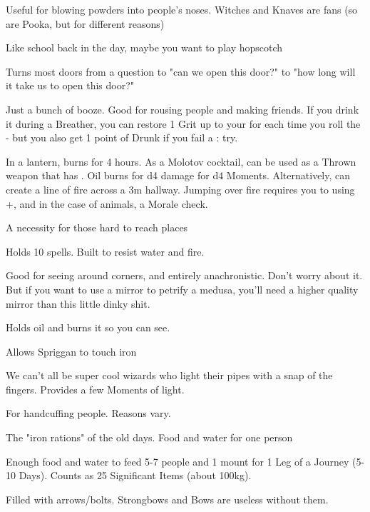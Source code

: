 {\begin{multicols}{2}
   Useful for blowing powders into people's noses.  Witches and Knaves are fans (so are Pooka, but for different reasons)
  
   Like school back in the day, maybe you want to play hopscotch
  
   Turns most doors from a question to "can we open this door?" to "how long will it take us to open this door?"
  
   Just a bunch of booze. Good for rousing people and making friends. If you drink it during a Breather, you can restore 1 Grit up to your \MAX for each time you roll the \UD - but you also get 1 point of Drunk if you fail a \RS: \VIG try.
  
   In a lantern, burns for 4 hours. As a Molotov cocktail, can be used as a Thrown weapon that has  .  Oil burns for d4 damage for d4 Moments. Alternatively, can create a line of fire across a 3m hallway. Jumping over fire requires you to \RO using \MD+\DEX, and in the case of animals, a Morale check. 
  
   A necessity for those hard to reach places
  
   Holds 10 spells. Built to resist water and fire.

\cbreak
  
   Good for seeing around corners, and entirely anachronistic. Don't worry about it. But if you want to use a mirror to petrify a medusa,  you'll need a higher quality mirror than this little dinky shit.
  
   Holds oil and burns it so you can see.
  
   Allows Spriggan to touch iron
  
   We can't all be super cool wizards who light their pipes with a snap of the fingers.  Provides a few Moments of light.
  
   For handcuffing people.  Reasons vary.
  
   The "iron rations" of the old days.  Food and water for one person

   Enough food and water to feed 5-7 people and 1 mount for 1 Leg of a Journey (5-10 Days).  Counts as 25 Significant Items (about 100kg).
  
   Filled with arrows/bolts.  Strongbows and Bows are useless without them.
  

\end{multicols}}
